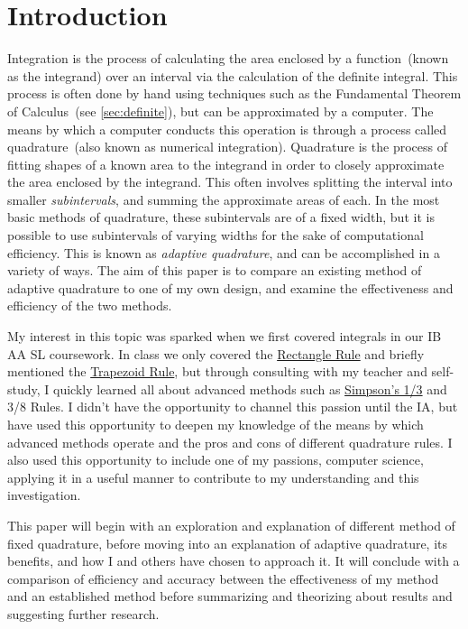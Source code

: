 \documentclass{paper}
\begin{document}
\insertTitlePage
{}
\tableofcontents
\thispagestyle{frontorback}
\newpage
\setcounter{page}{1}
\justifying

\section{Introduction}
\label{sec:intro}
Integration is the process of calculating the area enclosed by a function~(known as the integrand) over an interval via the calculation of the definite integral.
This process is often done by hand using techniques such as the Fundamental Theorem of Calculus~(see \cref{sec:definite}), but can be approximated by a computer.
The means by which a computer conducts this operation is through a process called quadrature~(also known as numerical integration).
Quadrature is the process of fitting shapes of a known area to the integrand in order to closely approximate the area enclosed by the integrand.
This often involves splitting the interval into smaller \textit{subintervals}, and summing the approximate areas of each.
In the most basic methods of quadrature, these subintervals are of a fixed width, but it is possible to use subintervals of varying widths for the sake of computational efficiency.
This is known as \emph{adaptive quadrature}, and can be accomplished in a variety of ways.
The aim of this paper is to compare an existing method of adaptive quadrature to one of my own design, and examine the effectiveness and efficiency of the two methods.

My interest in this topic was sparked when we first covered integrals in our IB AA SL coursework.
In class we only covered the \hyperref[sec:rect_rule]{Rectangle Rule} and briefly mentioned the \hyperref[sec:trap_rule]{Trapezoid Rule}, but through consulting with my teacher and self-study, I quickly learned all about advanced methods such as \hyperref[sec:smps_rule]{Simpson's 1/3} and 3/8 Rules.
I didn't have the opportunity to channel this passion until the IA, but have used this opportunity to deepen my knowledge of the means by which advanced methods operate and the pros and cons of different quadrature rules.
I also used this opportunity to include one of my passions, computer science, applying it in a useful manner to contribute to my understanding and this investigation.

This paper will begin with an exploration and explanation of different method of fixed quadrature, before moving into an explanation of adaptive quadrature, its benefits, and how I and others have chosen to approach it.
It will conclude with a comparison of efficiency and accuracy between the effectiveness of my method and an established method before summarizing and theorizing about results and suggesting further research.
\end{document}
